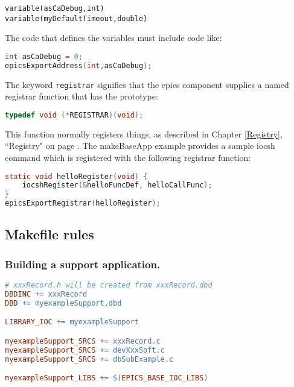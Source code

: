 \begin{verbatim}
variable(asCaDebug,int)
variable(myDefaultTimeout,double)
\end{verbatim}

The code that defines the variables must include code like:

\begin{lstlisting}[language=C]
int asCaDebug = 0;
epicsExportAddress(int,asCaDebug);
\end{lstlisting}

The keyword \verb|registrar| signifies that the epics component supplies a named registrar function that has the prototype:

\begin{lstlisting}[language=C]
typedef void (*REGISTRAR)(void);
\end{lstlisting}

This function normally registers things, as described in Chapter \ref{Registry}, ``Registry" on page \pageref{Registry}. The makeBaseApp example
provides a sample iocsh command which is registered with the following registrar function:

\begin{lstlisting}[language=C]
static void helloRegister(void) {
    iocshRegister(&helloFuncDef, helloCallFunc);
}
epicsExportRegistrar(helloRegister);
\end{lstlisting}

\subsection{Makefile rules}

\subsubsection{Building a support application.}

\begin{lstlisting}[language=make]
# xxxRecord.h will be created from xxxRecord.dbd
DBDINC += xxxRecord
DBD += myexampleSupport.dbd

LIBRARY_IOC += myexampleSupport

myexampleSupport_SRCS += xxxRecord.c
myexampleSupport_SRCS += devXxxSoft.c
myexampleSupport_SRCS += dbSubExample.c

myexampleSupport_LIBS += $(EPICS_BASE_IOC_LIBS)
\end{lstlisting}

